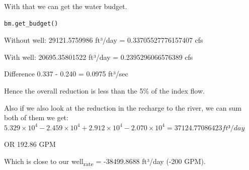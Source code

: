 \documentclass[titlepage,12pt]{unisubmission}
\begin{document}
With that we can get the water budget.
\begin{verbatim}
bm.get_budget()
\end{verbatim}

Without well:
29121.5759986 ft³/day = 0.33705527776157407 cfs

With well:
 20695.35801522 ft³/day = 0.2395296066576389 cfs

Difference 0.337 - 0.240 = 0.0975  ft³/sec

Hence the overall reduction is less than the 5\% of the index flow.

Also if we also look at the reduction in the recharge to the river, we can sum both of them we get:
\(5.329 \times 10^{4} - 2.459 \times 10^{4} + 2.912 \times 10^{4} - 2.070 \times 10^{4} = 37124.77086423 ft³/day\)

OR 192.86 GPM

Which is close to our well\textsubscript{rate} = -38499.8688 ft³/day (-200 GPM).
\end{document}
